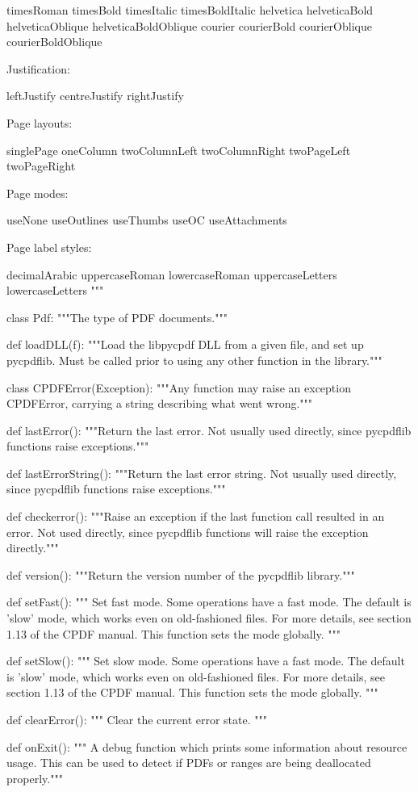 timesRoman timesBold timesItalic timesBoldItalic helvetica helveticaBold
helveticaOblique helveticaBoldOblique courier courierBold courierOblique
courierBoldOblique

Justification:

leftJustify centreJustify rightJustify

Page layouts:

singlePage oneColumn twoColumnLeft twoColumnRight twoPageLeft twoPageRight

Page modes:

useNone useOutlines useThumbs useOC useAttachments

Page label styles:

decimalArabic uppercaseRoman lowercaseRoman uppercaseLetters lowercaseLetters
"""

class Pdf:
    """The type of PDF documents."""

def loadDLL(f):
    """Load the libpycpdf DLL from a given file, and set up pycpdflib. Must be
    called prior to using any other function in the library."""

class CPDFError(Exception):
    """Any function may raise an exception CPDFError, carrying a string
    describing what went wrong."""

def lastError():
    """Return the last error. Not usually used directly, since pycpdflib
    functions raise exceptions."""

def lastErrorString():
    """Return the last error string. Not usually used directly, since pycpdflib
    functions raise exceptions."""

def checkerror():
    """Raise an exception if the last function call resulted in an error. Not
    used directly, since pycpdflib functions will raise the exception
    directly."""

def version():
    """Return the version number of the pycpdflib library."""

def setFast():
    """ Set fast mode. Some operations have a fast mode. The default is 'slow'
    mode, which works even on old-fashioned files. For more details, see
    section 1.13 of the CPDF manual. This function sets the mode globally. """

def setSlow():
    """ Set slow mode. Some operations have a fast mode. The default is 'slow'
    mode, which works even on old-fashioned files. For more details, see
    section 1.13 of the CPDF manual. This function sets the mode globally. """

def clearError():
    """ Clear the current error state. """

def onExit():
    """ A debug function which prints some information about
    resource usage. This can be used to detect if PDFs or ranges are being
    deallocated properly."""

